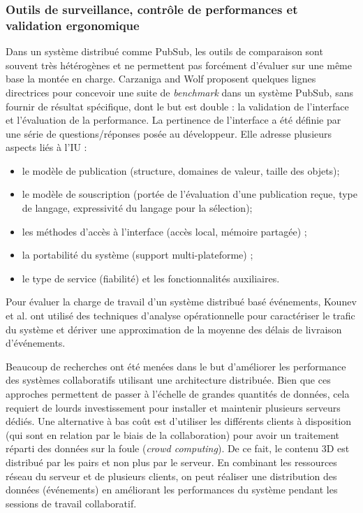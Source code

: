 \subsubsection{Outils de surveillance, contrôle de performances et validation ergonomique}
Dans un système distribué comme \gls{PubSub}, les outils de comparaison 
sont souvent très hétérogènes et ne permettent pas forcément d'évaluer sur une 
même base la montée en charge. 
Carzaniga and Wolf \cite{Carzaniga2002} proposent quelques 
lignes directrices pour concevoir une suite de \textit{benchmark} dans un système 
\gls{PubSub}, sans fournir de résultat spécifique, dont le but est double : la 
validation de l'interface et l'évaluation de la performance. 
La pertinence de l'interface a été définie par une série de questions/réponses 
posée au développeur. Elle adresse plusieurs aspects liés à l'\gls{IU} : 
\begin{itemize}
	\item le modèle de publication (structure, domaines de valeur, taille des objets);
	\item le modèle de souscription (portée de l'évaluation d'une publication reçue, 
	type de langage, expressivité du langage pour la sélection);
	\item les méthodes d'accès à l'interface (accès local, mémoire partagée) ; 
	\item la portabilité du système (support multi-plateforme) ;
	\item le type de service (fiabilité) et les fonctionnalités auxiliaires. 
\end{itemize}

Pour évaluer la charge de travail d'un système distribué basé événements, 
Kounev et al. \cite{Kounev2008} ont utilisé des techniques d'analyse 
opérationnelle pour caractériser le trafic du système et dériver une approximation 
de la moyenne des délais de livraison d'événements. 

Beaucoup de recherches ont été menées dans le but d'améliorer les performance 
des systèmes collaboratifs utilisant une architecture distribuée. Bien que ces 
approches permettent de passer à l'échelle de grandes quantités de données, cela 
requiert de lourds investissement pour installer et maintenir plusieurs serveurs 
dédiés. Une alternative à bas coût est d'utiliser les différents clients à disposition 
(qui sont en relation par le biais de la collaboration) pour avoir un traitement réparti 
des données sur la foule (\textit{crowd computing})\cite{Li2015}. De ce fait, le 
contenu \gls{3D} est distribué par les pairs et non plus par le serveur. En 
combinant les 
ressources réseau du serveur et de plusieurs clients, on peut réaliser une 
distribution des données (événements) en améliorant les performances du 
système pendant les sessions de travail collaboratif. 




